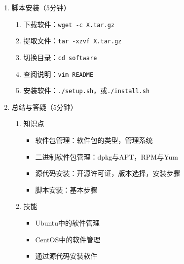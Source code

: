 \documentclass{TIJMUjiaoanLL}
\begin{document}
\begin{enumerate}
  \item 脚本安装（5分钟）
    \vspace*{-10pt}
    \begin{multicols}{2}
    \begin{enumerate}
      \item 下载软件：\verb|wget -c X.tar.gz|
      \item 提取文件：\verb|tar -xzvf X.tar.gz|
      \item 切换目录：\verb|cd software|
      \item 查阅说明：\verb|vim README|
      \item 安装软件：\verb|./setup.sh|，或\verb|./install.sh|
    \end{enumerate}
    \end{multicols}
    \vspace*{-10pt}


\otherTail
\newpage
\otherHeader


  \item 总结与答疑（5分钟）
    \begin{enumerate}
      \item 知识点
	\begin{itemize}
          \item 软件包管理：软件包的类型，管理系统
          \item 二进制软件包管理：dpkg与APT，RPM与Yum
          \item 源代码安装：开源许可证，版本选择，安装步骤
          \item 脚本安装：基本步骤
	\end{itemize}
      \item 技能
	\begin{itemize}
          \item Ubuntu中的软件管理
          \item CentOS中的软件管理
          \item 通过源代码安装软件
	\end{itemize}
    \end{enumerate}

\end{enumerate}

\otherTail
\end{document}
